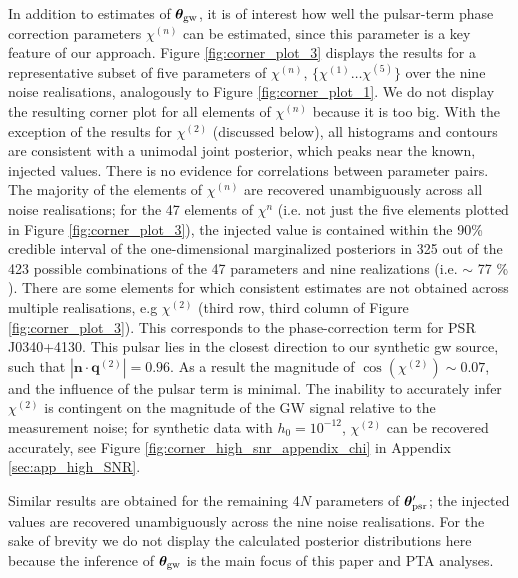 \documentclass[fleqn,usenatbib,useAMS]{mnras}
\begin{document}
In addition to estimates of $\boldsymbol{\theta}_{\rm gw}$, it is of interest how well the pulsar-term phase correction parameters $\chi^{(n)}$ can be estimated, since this parameter is a key feature of our approach. Figure \ref{fig:corner_plot_3} displays the results for a representative subset of five parameters of $\chi^{(n)}$, $ \{\chi^{(1)} \dots \chi^{(5)} \}$ over the nine noise realisations, analogously to Figure \ref{fig:corner_plot_1}. We do not display the resulting corner plot for all elements of $\chi^{(n)}$ because it is too big. With the exception of the results for $\chi^{(2)}$ (discussed below), all histograms and contours are consistent with a unimodal joint posterior, which peaks near the known, injected values. There is no evidence for correlations between parameter pairs. The majority of the elements of $\chi^{(n)}$ are recovered unambiguously across all noise realisations; for the 47 elements of $\chi^{n}$ (i.e. not just the five elements plotted in Figure \ref{fig:corner_plot_3}), the injected value is  contained within the 90\% credible interval of the one-dimensional marginalized posteriors in 325 out of the 423 possible combinations of the 47 parameters and nine realizations (i.e. $\sim$ 77 $\%$). There are some elements for which consistent estimates are not obtained across multiple realisations, e.g $\chi^{(2)}$ (third row, third column of Figure \ref{fig:corner_plot_3}). This corresponds to the phase-correction term for PSR J0340+4130. This pulsar lies in the closest direction to our synthetic gw source, such that $| \boldsymbol{n} \cdot \boldsymbol{q}^{(2)}| = 0.96$. As a result the magnitude of $\cos \left( \chi^{(2)}\right) \sim 0.07$, and the influence of the pulsar term is minimal. The inability to accurately infer $\chi^{(2)}$ is contingent on the magnitude of the GW signal relative to the measurement noise; for synthetic data with $h_0 = 10^{-12}$, $\chi^{(2)}$ can be recovered accurately, see Figure \ref{fig:corner_high_snr_appendix_chi} in Appendix \ref{sec:app_high_SNR}. \newline 

Similar results are obtained for the remaining 4$N$ parameters of $\boldsymbol{\theta}_{\rm psr}'$; the injected values are recovered unambiguously across the nine noise realisations. For the sake of brevity we do not display the calculated posterior distributions here because the inference of $\boldsymbol{\theta}_{\rm gw}$ is the main focus of this paper and PTA analyses. \newline 
\end{document}
